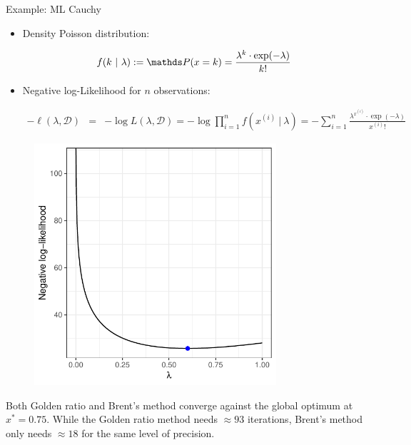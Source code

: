\documentclass[11pt,compress,t,notes=noshow, xcolor=table]{beamer}
\begin{document}
\begin{vbframe}{Example: ML Cauchy}


\begin{itemize}
\item Density Poisson distribution:
\begin{footnotesize}
$$
f(k ~|~ \lambda) := \P(x = k) = \frac{\lambda^k \cdot \exp(-\lambda)}{k!}
$$
\end{footnotesize}
\item Negative log-Likelihood for $n$ observations:
\begin{footnotesize}
\begin{eqnarray*}
- \ell(\lambda, \mathcal{D}) &=& - \log L(\lambda, \mathcal{D}) = - \log \prod_{i = 1}^n  f\left(x^{(i)} ~|~ \lambda\right) =  - \sum_{i = 1}^n \frac{\lambda^{x^{(i)} } \cdot \exp(-\lambda)}{x^{(i)} !} 
\end{eqnarray*}
\end{footnotesize}

\end{itemize}

\vspace*{-0.5cm}
\begin{figure}
  \includegraphics[width = 0.8\textwidth]{figure_man/poisson.pdf}
\end{figure}




\framebreak 

Both Golden ratio and Brent's method converge against the global optimum at $x^\ast = 0.75$. While the Golden ratio method needs $\approx 93$ iterations, Brent's method only needs $\approx 18$ for the same level of precision. 


\end{vbframe}
\end{document}
